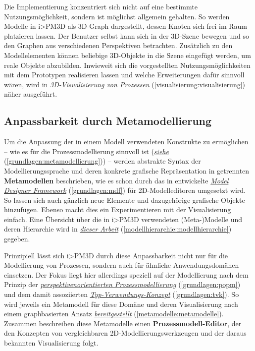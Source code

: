 \documentclass[a4paper,10pt]{sphinxmanual}
\begin{document}
Die Implementierung konzentriert sich nicht auf eine bestimmte Nutzungsmöglichkeit, sondern ist möglichst allgemein gehalten.
So werden Modelle in i\textgreater{}PM3D als 3D-Graph dargestellt, dessen Knoten sich frei im Raum platzieren lassen.
Der Benutzer selbst kann sich in der 3D-Szene bewegen und so den Graphen aus verschiedenen Perspektiven betrachten.
Zusätzlich zu den Modellelementen können beliebige 3D-Objekte in die Szene eingefügt werden, um reale Objekte abzubilden.
Inwieweit sich die vorgestellten Nutzungsmöglichkeiten mit dem Prototypen realisieren lassen und welche Erweiterungen dafür sinnvoll wären, wird in {\hyperref[visualisierung:visualisierung]{\emph{3D-Visualisierung von Prozessen}}} (\autoref*{visualisierung:visualisierung}) näher ausgeführt.


\subsection{Anpassbarkeit durch Metamodellierung}
\label{einleitung:anpassbarkeit-durch-metamodellierung}
Um die Anpassung der in einem Modell verwendeten Konstrukte zu ermöglichen – wie es für die Prozessmodellierung sinnvoll ist ({\hyperref[grundlagen:metamodellierung]{\emph{siehe}}} (\autoref*{grundlagen:metamodellierung})) – werden abstrakte Syntax der Modellierungssprache und deren konkrete grafische Repräsentation in getrennten \textbf{Metamodellen} beschrieben, wie es schon durch das in \cite{roth_konzeption_2011} entwickelte {\hyperref[grundlagen:mdf]{\emph{Model Designer Framework}}} (\autoref*{grundlagen:mdf}) für 2D-Modelleditoren umgesetzt wird.
So lassen sich auch gänzlich neue Elemente und dazugehörige grafische Objekte hinzufügen. Ebenso macht dies ein Experimentieren mit der Visualisierung einfach.
Eine Übersicht über die in i\textgreater{}PM3D verwendeten (Meta-)Modelle und deren Hierarchie wird in {\hyperref[modellhierarchie:modellhierarchie]{\emph{dieser Arbeit}}} (\autoref*{modellhierarchie:modellhierarchie}) gegeben.

Prinzipiell lässt sich i\textgreater{}PM3D durch diese Anpassbarkeit nicht nur für die Modellierung von Prozessen, sondern auch für ähnliche Anwendungsdomänen einsetzen.
Der Fokus liegt hier allerdings speziell auf der Modellierung nach dem Prinzip der {\hyperref[grundlagen:popm]{\emph{perspektivenorientierten Prozessmodellierung}}} (\autoref*{grundlagen:popm}) und dem damit assoziierten {\hyperref[grundlagen:tvk]{\emph{Typ-Verwendungs-Konzept}}} (\autoref*{grundlagen:tvk}).
So wird jeweils ein Metamodell für diese Domäne und deren Visualisierung nach einem graphbasierten Ansatz {\hyperref[metamodelle:metamodelle]{\emph{bereitgestellt}}} (\autoref*{metamodelle:metamodelle}).
Zusammen beschreiben diese Metamodelle einen \textbf{Prozessmodell-Editor}, der den Konzepten von vergleichbaren 2D-Modellierungswerkzeugen und der daraus bekannten Visualisierung folgt.
\end{document}
